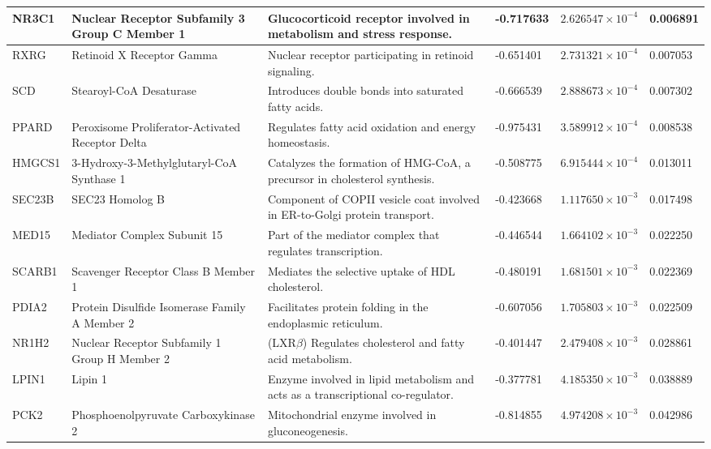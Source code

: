 \begin{longtable}{p{1.5cm} p{4cm} p{5cm} p{1.5cm} p{1.5cm} p{1.5cm}}
    \hline
    NR3C1  & Nuclear Receptor Subfamily 3 Group C Member 1 & Glucocorticoid receptor involved in metabolism and stress response.  & -0.717633 & $2.626547\times10^{-4}$ & 0.006891 \\
    \hline
    RXRG   & Retinoid X Receptor Gamma                 & Nuclear receptor participating in retinoid signaling.  & -0.651401 & $2.731321\times10^{-4}$ & 0.007053 \\
    \hline
    SCD    & Stearoyl-CoA Desaturase                   & Introduces double bonds into saturated fatty acids.  & -0.666539 & $2.888673\times10^{-4}$ & 0.007302 \\
    \hline
    PPARD  & Peroxisome Proliferator-Activated Receptor Delta & Regulates fatty acid oxidation and energy homeostasis.  & -0.975431 & $3.589912\times10^{-4}$ & 0.008538 \\
    \hline
    HMGCS1 & 3-Hydroxy-3-Methylglutaryl-CoA Synthase 1 & Catalyzes the formation of HMG-CoA, a precursor in cholesterol synthesis.  & -0.508775 & $6.915444\times10^{-4}$ & 0.013011 \\
    \hline
    SEC23B & SEC23 Homolog B                         & Component of COPII vesicle coat involved in ER-to-Golgi protein transport.  & -0.423668 & $1.117650\times10^{-3}$ & 0.017498 \\
    \hline
    MED15  & Mediator Complex Subunit 15              & Part of the mediator complex that regulates transcription.  & -0.446544 & $1.664102\times10^{-3}$ & 0.022250 \\
    \hline
    SCARB1 & Scavenger Receptor Class B Member 1       & Mediates the selective uptake of HDL cholesterol.  & -0.480191 & $1.681501\times10^{-3}$ & 0.022369 \\
    \hline
    PDIA2  & Protein Disulfide Isomerase Family A Member 2 & Facilitates protein folding in the endoplasmic reticulum.  & -0.607056 & $1.705803\times10^{-3}$ & 0.022509 \\
    \hline
    NR1H2  & Nuclear Receptor Subfamily 1 Group H Member 2 & (LXR$\beta$) Regulates cholesterol and fatty acid metabolism.  & -0.401447 & $2.479408\times10^{-3}$ & 0.028861 \\
    \hline
    LPIN1  & Lipin 1                                  & Enzyme involved in lipid metabolism and acts as a transcriptional co-regulator.  & -0.377781 & $4.185350\times10^{-3}$ & 0.038889 \\
    \hline
    PCK2   & Phosphoenolpyruvate Carboxykinase 2        & Mitochondrial enzyme involved in gluconeogenesis.  & -0.814855 & $4.974208\times10^{-3}$ & 0.042986 \\

\end{longtable}
